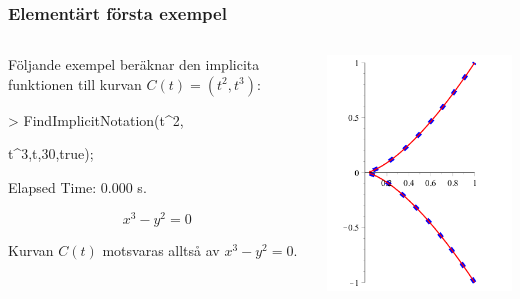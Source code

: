 \documentclass{beamer}
\begin{document}
\begin{frame}
	\frametitle{Elementärt första exempel}
	\begin{example}
		\begin{columns}[onlytextwidth]
			\begin{column}{0.5\textwidth}
Följande exempel beräknar den implicita funktionen till kurvan $C(t) =
\left(t^2, t^3\right)$:

\begin{semiverbatim}
> FindImplicitNotation(t\^{}2,

\qquad t\^{}3,t,30,true);

Elapsed Time: 0.000 s.
\end{semiverbatim}
\[x^3 - y^2 = 0\]

Kurvan $C(t)$ motsvaras alltså av $x^3 - y^2 = 0$.
			\end{column}
			\begin{column}{0.5\textwidth}
				\begin{center}
					\includegraphics[scale=0.6]{Export/implicitplot1_2.png}
				\end{center}
			\end{column}
		\end{columns}
	\end{example}
\end{frame}
\end{document}
